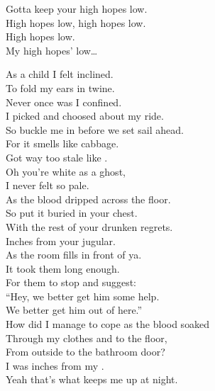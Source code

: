 Gotta keep your high hopes low. \\
High hopes low, high hopes low. \\

High hopes low. \\

My high hopes' low… \\




As a child I felt inclined. \\
To fold my ears in twine. \\
Never once was I confined. \\
I picked and choosed about my ride. \\
So buckle me in before we set sail ahead. \\
For it smells like cabbage. \\
Got way too stale like . \\

Oh you're white as a ghost, \\
I never felt so pale. \\
As the blood dripped across the floor. \\

So put it buried in your chest. \\
With the rest of your drunken regrets. \\
Inches from your jugular. \\
As the room fills in front of ya. \\

It took them long enough. \\
For them to stop and suggest: \\
``Hey, we better get him some help. \\
We better get him out of here.'' \\

How did I manage to cope as the blood soaked \\
Through my clothes and to the floor, \\
From outside to the bathroom door? \\
I was inches from my . \\
Yeah that's what keeps me up at night. \\


